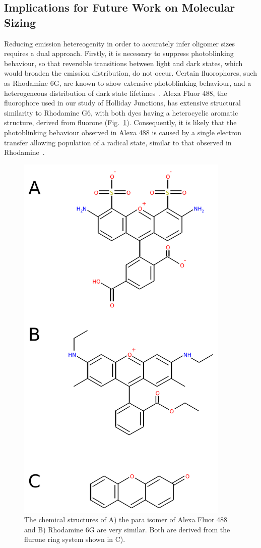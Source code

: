 \subsection{Implications for Future Work on Molecular Sizing}
Reducing emission hetereogenity in order to accurately infer oligomer sizes requires a dual approach. Firstly, it is necessary to suppress photoblinking behaviour, so that reversible transitions between light and dark states, which would broaden the emission distribution, do not occur. Certain fluorophores, such as Rhodamine 6G, are known to show extensive photoblinking behaviour, and a heterogeneous distribution of dark state lifetimes~\cite{zondervan03}. Alexa Fluor 488, the fluorophore used in our study of Holliday Junctions, has extensive structural similarity to Rhodamine G6, with both dyes having a heterocyclic aromatic structure, derived from fluorone (Fig.~\ref{fig:fluorone}). Consequently, it is likely that the photoblinking behaviour observed in Alexa 488 is caused by a single electron transfer allowing population of a radical state, similar to that observed in Rhodamine~\cite{zondervan03}. 


\begin{figure}
   \begin{center}
      \includegraphics*[width=4in]{sizing/fluorone.pdf}
      \caption{The chemical structures of A) the para isomer of Alexa Fluor 488 and B) Rhodamine 6G are very similar. Both are derived from the flurone ring system shown in C).}
      \label{fig:fluorone}
   \end{center}
\end{figure}


